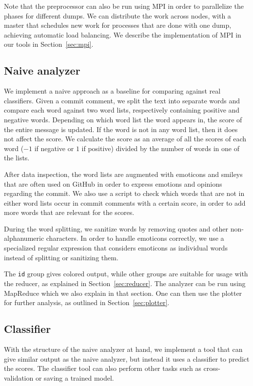 \documentclass{article}
\begin{document}
Note that the preprocessor can also be run using MPI in order to parallelize 
the phases for different dumps. We can distribute the work across nodes, with 
a master that schedules new work for processes that are done with one dump, 
achieving automatic load balancing. We describe the implementation of MPI in 
our tools in Section~\ref{sec:mpi}.

\subsection{Naive analyzer}\label{sec:analyzer}
We implement a naive approach as a baseline for comparing against real 
classifiers. Given a commit comment, we split the text into separate words and 
compare each word against two word lists, respectively containing positive and 
negative words. Depending on which word list the word appears in, the score of 
the entire message is updated. If the word is not in any word list, then it 
does not affect the score. We calculate the score as an average of all the 
scores of each word ($-1$ if negative or $1$ if positive) divided by the number 
of words in one of the lists.

After data inspection, the word lists are augmented with emoticons and smileys 
that are often used on GitHub in order to express emotions and opinions 
regarding the commit. We also use a script to check which words that are not 
in either word lists occur in commit comments with a certain score, in order to 
add more words that are relevant for the scores.

During the word splitting, we sanitize words by removing quotes and other 
non-alphanumeric characters. In order to handle emoticons correctly, we use 
a specialized regular expression that considers emoticons as individual words 
instead of splitting or sanitizing them.

The {\tt id} group gives colored output, while other groups are suitable for 
usage with the reducer, as explained in Section~\ref{sec:reducer}. The analyzer
can be run using MapReduce which we also explain in that section. One can then
use the plotter for further analysis, as outlined in Section~\ref{sec:plotter}.

\subsection{Classifier}\label{sec:classifier}
With the structure of the naive analyzer at hand, we implement a tool that can 
give similar output as the naive analyzer, but instead it uses a classifier to
predict the scores. The classifier tool can also perform other tasks such as 
cross-validation or saving a trained model.
\end{document}
